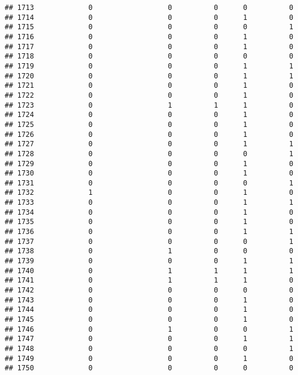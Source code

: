 \documentclass[
]{article}
\begin{document}
\begin{verbatim}
## 1713             0                  0          0      0          0
## 1714             0                  0          0      1          0
## 1715             0                  0          0      0          1
## 1716             0                  0          0      1          0
## 1717             0                  0          0      1          0
## 1718             0                  0          0      0          0
## 1719             0                  0          0      1          1
## 1720             0                  0          0      1          1
## 1721             0                  0          0      1          0
## 1722             0                  0          0      1          0
## 1723             0                  1          1      1          0
## 1724             0                  0          0      1          0
## 1725             0                  0          0      1          0
## 1726             0                  0          0      1          0
## 1727             0                  0          0      1          1
## 1728             0                  0          0      0          1
## 1729             0                  0          0      1          0
## 1730             0                  0          0      1          0
## 1731             0                  0          0      0          1
## 1732             1                  0          0      1          0
## 1733             0                  0          0      1          1
## 1734             0                  0          0      1          0
## 1735             0                  0          0      1          0
## 1736             0                  0          0      1          1
## 1737             0                  0          0      0          1
## 1738             0                  1          0      0          0
## 1739             0                  0          0      1          1
## 1740             0                  1          1      1          1
## 1741             0                  1          1      1          0
## 1742             0                  0          0      0          0
## 1743             0                  0          0      1          0
## 1744             0                  0          0      1          0
## 1745             0                  0          0      1          0
## 1746             0                  1          0      0          1
## 1747             0                  0          0      1          1
## 1748             0                  0          0      0          1
## 1749             0                  0          0      1          0
## 1750             0                  0          0      0          0

\end{verbatim}
\end{document}
